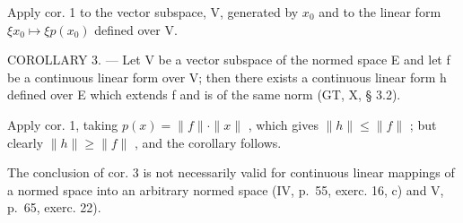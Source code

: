 Apply cor. 1 to the vector subspace, V, generated by \(x_0\) and to the linear form \(\xi x_0 \mapsto \xi p(x_0)\) defined over V.

COROLLARY 3. --- Let V be a vector subspace of the normed space E and let f be a continuous linear form over V; then there exists a continuous linear form h defined over E which extends f and is of the same norm (GT, X, § 3.2).

Apply cor. 1, taking \(p(x) = \| f \| \cdot \| x \|\) , which gives \(\| h \| \leqslant \| f \|\) ; but clearly \(\| h \| \geqslant \| f \|\) , and the corollary follows.

The conclusion of cor. 3 is not necessarily valid for continuous linear mappings of a normed space into an arbitrary normed space (IV, p.~55, exerc. 16, c) and V, p.~65, exerc. 22).

